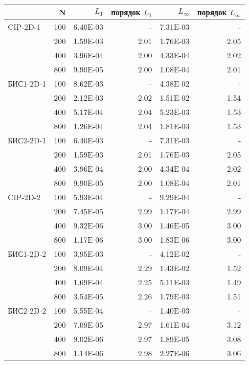 \begin{tabular}{lrrrrr}

 & N & $L_1$ & порядок $L_1$ & $L_{\infty}$ & порядок $L_{\infty}$ \\ 
 \hline
CIP-2D-1 & 100 & 6.40E-03 & - & 7.31E-03 & - \\ 
 & 200 & 1.59E-03 & 2.01 & 1.76E-03 & 2.05 \\ 
 & 400 & 3.96E-04 & 2.00 & 4.33E-04 & 2.02 \\ 
 & 800 & 9.90E-05 & 2.00 & 1.08E-04 & 2.01 \\ 
 \hline
БИС1-2D-1 & 100 & 8.62E-03 & - & 4.38E-02 & - \\ 
 & 200 & 2.12E-03 & 2.02 & 1.51E-02 & 1.54 \\ 
 & 400 & 5.17E-04 & 2.04 & 5.23E-03 & 1.53 \\ 
 & 800 & 1.26E-04 & 2.04 & 1.81E-03 & 1.53 \\ 
 \hline
БИС2-2D-1 & 100 & 6.40E-03 & - & 7.31E-03 & - \\ 
 & 200 & 1.59E-03 & 2.01 & 1.76E-03 & 2.05 \\ 
 & 400 & 3.96E-04 & 2.00 & 4.34E-04 & 2.02 \\ 
 & 800 & 9.90E-05 & 2.00 & 1.08E-04 & 2.01 \\ 
 \hline
CIP-2D-2 & 100 & 5.93E-04 & - & 9.29E-04 & - \\ 
 & 200 & 7.45E-05 & 2.99 & 1.17E-04 & 2.99 \\ 
 & 400 & 9.32E-06 & 3.00 & 1.46E-05 & 3.00 \\ 
 & 800 & 1.17E-06 & 3.00 & 1.83E-06 & 3.00 \\ 
 \hline
БИС1-2D-2 & 100 & 3.95E-03 & - & 4.12E-02 & - \\ 
 & 200 & 8.09E-04 & 2.29 & 1.43E-02 & 1.52 \\ 
 & 400 & 1.69E-04 & 2.25 & 5.11E-03 & 1.49 \\ 
 & 800 & 3.54E-05 & 2.26 & 1.79E-03 & 1.51 \\ 
 \hline
БИС2-2D-2 & 100 & 5.55E-04 & - & 1.40E-03 & - \\ 
 & 200 & 7.09E-05 & 2.97 & 1.61E-04 & 3.12 \\ 
 & 400 & 9.02E-06 & 2.97 & 1.89E-05 & 3.08 \\ 
 & 800 & 1.14E-06 & 2.98 & 2.27E-06 & 3.06 \\ 
\end{tabular}
